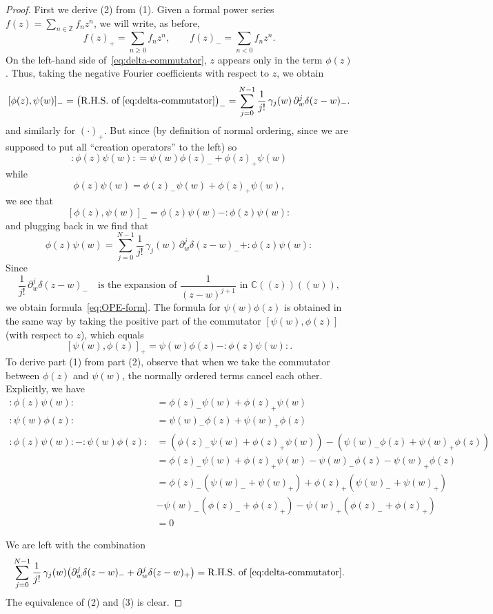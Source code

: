 \documentclass[12pt]{article}
\begin{document}
\begin{proof}
First we derive (2) from (1).
Given a formal power series $f(z)=\sum_{n\in\mathbb{Z}} f_n z^n$, 
we will write, as before,
\[
f(z)_+ = \sum_{n\ge 0} f_n z^n,
\qquad
f(z)_- = \sum_{n<0} f_n z^n.
\]
On the left-hand side of~\eqref{eq:delta-commutator}, 
$z$ appears only in the term $\phi(z)$. 
Thus, taking the negative Fourier coefficients with respect to $z$, we obtain
\[
[\phi(z),\psi(w)]_- = 
\big(\text{R.H.S. of~\eqref{eq:delta-commutator}}\big)_- = \sum_{j=0}^{N-1} \frac{1}{j!}\,\gamma_j(w)\,
\partial_w^j \delta(z-w)_-.
\]
and similarly for $(\cdot)_+$.
But since (by definition of normal ordering, since we are supposed to put all “creation operators” to the left) so 
\[
:\phi(z)\psi(w): 
= \psi(w)\phi(z)_- + \phi(z)_+\psi(w)
\]
while 
\[
\phi(z)\psi(w) = \phi(z)_-\psi(w) + \phi(z)_+\psi(w),
\]
we see that
\[
[\phi(z),\psi(w)]_{-} = 
\phi(z)\psi(w) - :\phi(z)\psi(w):
\]
and plugging back in we find that
\[
\phi(z)\psi(w) = \sum_{j=0}^{N-1} \frac{1}{j!}\,\gamma_j(w)\,\partial_w^j \delta(z-w)_- + :\phi(z)\psi(w):
\]
Since
\[
\frac{1}{j!}\,\partial_w^j \delta(z-w)_-
\quad \text{is the expansion of } 
\frac{1}{(z-w)^{j+1}}
\text{ in } \mathbb{C}((z))((w)),
\]
we obtain formula~\eqref{eq:OPE-form}.
The formula for $\psi(w)\phi(z)$ is obtained in the same way
by taking the positive part of the commutator $[\psi(w),\phi(z)]$ 
(with respect to $z$), which equals
\[
[\psi(w),\phi(z)]_+ = \psi(w)\phi(z) - :\phi(z)\psi(w):.
\]
To derive part (1) from part (2), observe that when we take the commutator
between $\phi(z)$ and $\psi(w)$, the normally ordered terms cancel each other. Explicitly, we have
\begin{align*}
:\phi(z)\psi(w):
&= \phi(z)_- \psi(w) + \phi(z)_+ \psi(w) \\
:\psi(w)\phi(z):
&= \psi(w)_- \phi(z) + \psi(w)_+ \phi(z) \\
:\phi(z)\psi(w): - :\psi(w)\phi(z): &= (\phi(z)_- \psi(w) + \phi(z)_+ \psi(w)) - (\psi(w)_- \phi(z) + \psi(w)_+ \phi(z)) \\
&= \phi(z)_- \psi(w) + \phi(z)_+ \psi(w) - \psi(w)_- \phi(z) - \psi(w)_+ \phi(z) \\
&= \phi(z)_- (\psi(w)_- + \psi(w)_+) + \phi(z)_+ (\psi(w)_- + \psi(w)_+) \\
&- \psi(w)_- (\phi(z)_- + \phi(z)_+) - \psi(w)_+ (\phi(z)_- + \phi(z)_+) \\
&= 0
\end{align*}

We are left with the combination
\[
\sum_{j=0}^{N-1} \frac{1}{j!}\,\gamma_j(w)
\big(\partial_w^j \delta(z-w)_- + \partial_w^j \delta(z-w)_+\big)
= \text{R.H.S. of~\eqref{eq:delta-commutator}}.
\]
The equivalence of (2) and (3) is clear.
\end{proof}
\end{document}
